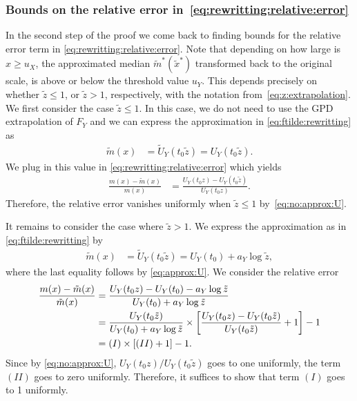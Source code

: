 \documentclass{statsoc}
\theoremstyle{break}
\newcommand{\tzero}{t_0}
\begin{document}
\subsubsection{Bounds on the relative error in~\eqref{eq:rewritting:relative:error}}\label{sec:bounds_rel}
In the second step of the proof we come back to finding bounds for the relative error term in \eqref{eq:rewritting:relative:error}. 
Note that depending on how large is $x \geq u_X$, the approximated median $\tilde m^*(\tilde x^*)$ transformed back to the original scale, is above or below the threshold value $u_Y$.
This depends precisely on whether $\tilde z \leq 1$, or $\tilde z > 1$, respectively, with the notation from~\eqref{eq:z:extrapolation}.
We first consider the case $\tilde z \leq 1$.
In this case, we do not need to use the GPD extrapolation of $F_Y$ and we can express the approximation in \eqref{eq:ftilde:rewritting} as 
\begin{align*}
	\tilde m(x) &=  \tilde U_Y(\tzero \tilde z) = U_Y(\tzero \tilde z).
\end{align*}
We plug in this value in \eqref{eq:rewritting:relative:error} which yields
\begin{align*}
	\frac{m(x) - \tilde m(x)}{m(x)}& = \frac{U_Y(\tzero z) - U_Y(\tzero \tilde z)}{  U_Y(\tzero   z)}.
\end{align*}
Therefore, the relative error vanishes uniformly when $\tilde z \leq 1$ by~\eqref{eq:no:approx:U}.

It remains to consider the case where $\tilde z > 1$. 
We express the approximation as in \eqref{eq:ftilde:rewritting} by 
\begin{align*}
	\tilde m(x) &= \tilde U_Y(t_0 \tilde z) = U_Y(\tzero)  + a_Y \log \tilde z ,
\end{align*}
where the last equality follows by \eqref{eq:approx:U}.
We consider the relative error
\begin{align}
	\notag \frac{m(x) - \tilde m(x)}{\tilde m(x)}& = \frac{U_Y(\tzero z) - U_Y(\tzero)  - a_Y \log \tilde z }{ U_Y(\tzero)  + a_Y \log \tilde z }\\
		 \notag & = 	
	  \frac{U_Y(t_0 \tilde z)}{U_Y(\tzero)  + a_Y \log \tilde z }\times \left[ \frac{U_Y(\tzero z) - U_Y(\tzero \tilde z)  }{U_Y(t_0 \tilde z) } + 1\right]  - 1 \\
	\label{decomposition} & = (I) \times [ (II) +1] -1.
\end{align}
Since by \eqref{eq:no:approx:U}, $U_Y(t_0 z)/ U_Y(t_0 \tilde z)$ goes to one uniformly, the term $(II)$ goes to zero uniformly. Therefore, 
it suffices to show that term $(I)$ goes to 1 uniformly.
\end{document}

